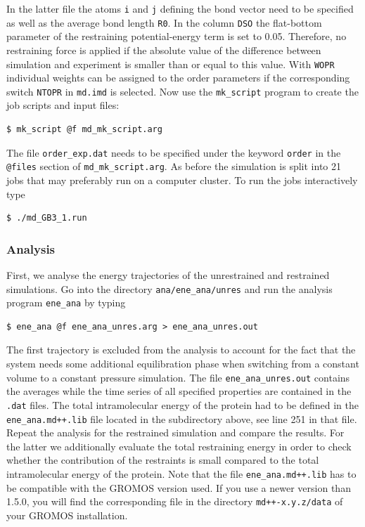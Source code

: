 In the latter file the atoms \texttt{i} and \texttt{j} defining the bond vector need to be specified as well as the average bond length \texttt{R0}. 
In the column \texttt{DSO} the flat-bottom parameter of the restraining potential-energy term is set to 0.05. Therefore, no restraining force is applied if the absolute value of the difference between simulation and experiment is smaller than or equal to this value.
With \texttt{WOPR} individual weights can be assigned to the order parameters if the corresponding switch \texttt{NTOPR} in \texttt{md.imd}
is selected. Now use the \texttt{mk\_script} program to create the job scripts and input files:
\begin{lstlisting}
$ mk_script @f md_mk_script.arg
\end{lstlisting}
The file \texttt{order\_exp.dat} needs to be specified under the keyword \texttt{order} in the \texttt{@files} section of \texttt{md\_mk\_script.arg}.
As before the simulation is split into 21 jobs that may preferably run on a computer cluster. To run the jobs interactively type
\begin{lstlisting}
$ ./md_GB3_1.run
\end{lstlisting}

\subsubsection{Analysis}
First, we analyse the energy trajectories of the unrestrained and restrained simulations. Go into the directory \texttt{ana/ene\_ana/unres} and run the analysis program \texttt{ene\_ana} by typing
\begin{lstlisting}
$ ene_ana @f ene_ana_unres.arg > ene_ana_unres.out
\end{lstlisting}
The first trajectory is excluded from the analysis to account for the fact that the system needs some additional equilibration phase when switching from a constant volume to a constant pressure simulation.
The file \texttt{ene\_ana\_unres.out} contains the averages while the time series of all specified properties are contained in the \texttt{.dat} files. The total intramolecular energy of the protein 
had to be defined in the \texttt{ene\_ana.md++.lib} file located in the subdirectory above, see line 251 in that file. Repeat the analysis for the restrained simulation and compare the results. For the latter we additionally 
evaluate the total restraining energy in order to check whether the contribution of the restraints is small compared to the total intramolecular energy of the protein. 
Note that the file \texttt{ene\_ana.md++.lib} has to be compatible with the GROMOS version used. If you use a newer version than 1.5.0, you will find the corresponding file in the directory \texttt{md++-x.y.z/data} of your GROMOS installation.

